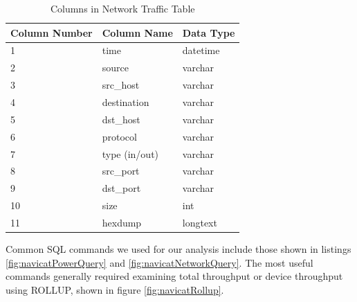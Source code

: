 \begin{table}[H]
    \centering
    \caption{Columns in Network Traffic Table}
    \begin{tabular}{@{}lll@{}}
    \toprule
    Column Number & Column Name & Data Type \\ \midrule
    1             & time        & datetime  \\
    2             & source      & varchar   \\
    3             & src\_host   & varchar   \\
    4             & destination & varchar   \\
    5             & dst\_host   & varchar   \\
    6             & protocol    & varchar   \\
    7             & type (in/out)       & varchar   \\
    8             & src\_port   & varchar   \\
    9             & dst\_port   & varchar   \\
    10            & size        & int       \\
    11            & hexdump     & longtext  \\ \bottomrule
    \end{tabular}
    \label{tab:netcol}
    \end{table}

Common SQL commands we used for our analysis include those shown in listings \ref{fig:navicatPowerQuery} and \ref{fig:navicatNetworkQuery}. The most useful commands generally required examining total throughput or device throughput using ROLLUP, shown in figure \ref{fig:navicatRollup}.

